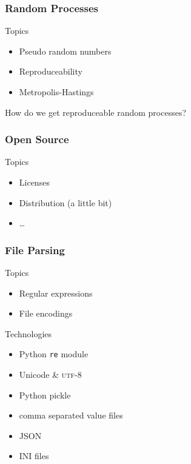 \begin{frame}[fragile]
\frametitle{Random Processes}
\begin{block}{Topics}
\begin{itemize}
\item Pseudo random numbers
\item Reproduceability
\item Metropolis-Hastings
\end{itemize}
\end{block}

How do we get reproduceable random processes?
\end{frame}

\begin{frame}[fragile]
\frametitle{Open Source}
\begin{block}{Topics}
\begin{itemize}
\item Licenses
\item Distribution (a little bit)
\item \ldots
\end{itemize}
\end{block}

\end{frame}

\begin{frame}[fragile]
\frametitle{File Parsing}
\begin{block}{Topics}
\begin{itemize}
\item Regular expressions
\item File encodings
\end{itemize}
\end{block}

\begin{block}{Technologies}
\begin{itemize}
\item Python \alert{\texttt{re}} module
\item Unicode \& \textsc{utf}-8
\item Python pickle
\item comma separated value files
\item JSON
\item INI files
\end{itemize}
\end{block}
\end{frame}


